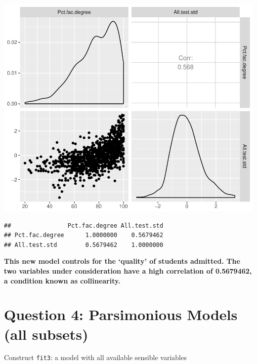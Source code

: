 \documentclass[]{article}
\newenvironment{Shaded}{\begin{snugshade}}{\end{snugshade}}
\newcommand{\KeywordTok}[1]{\textcolor[rgb]{0.13,0.29,0.53}{\textbf{#1}}}
\newcommand{\StringTok}[1]{\textcolor[rgb]{0.31,0.60,0.02}{#1}}
\newcommand{\OperatorTok}[1]{\textcolor[rgb]{0.81,0.36,0.00}{\textbf{#1}}}
\newcommand{\NormalTok}[1]{#1}
\begin{document}
\begin{flushleft}\includegraphics{Midterm_11_01_2016_Answers_files/figure-latex/unnamed-chunk-24-1} \end{flushleft}

\begin{Shaded}
\end{Shaded}

\begin{verbatim}
##                Pct.fac.degree All.test.std
## Pct.fac.degree      1.0000000    0.5679462
## All.test.std        0.5679462    1.0000000
\end{verbatim}

\textbf{This new model controls for the `quality' of students admitted.
The two variables under consideration have a high correlation of
0.5679462, a condition known as collinearity.}

\section{Question 4: Parsimonious Models (all
subsets)}\label{question-4-parsimonious-models-all-subsets}

Construct \texttt{fit3}: a model with all available sensible variables
\end{document}
